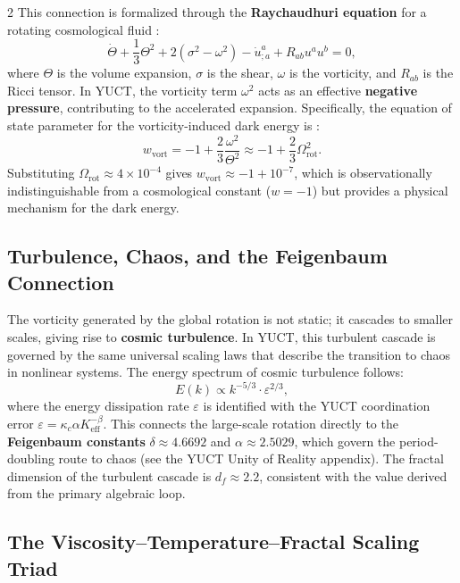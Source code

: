 \documentclass[12pt,a4paper]{article}
\begin{document}
\begin{multicols}{2}
		This connection is formalized through the \textbf{Raychaudhuri equation} for a rotating cosmological fluid \cite{Ellis1971}:
		\begin{equation}
			\dot{\Theta} + \frac{1}{3}\Theta^2 + 2(\sigma^2 - \omega^2) - \dot{u}^a_{;a} + R_{ab}u^a u^b = 0,
		\end{equation}
		where \(\Theta\) is the volume expansion, \(\sigma\) is the shear, \(\omega\) is the vorticity, and \(R_{ab}\) is the Ricci tensor. In YUCT, the vorticity term \(\omega^2\) acts as an effective \textbf{negative pressure}, contributing to the accelerated expansion. Specifically, the equation of state parameter for the vorticity-induced dark energy is \cite{Tsagas2011}:
		\begin{equation}
			w_{\mathrm{vort}} = -1 + \frac{2}{3}\frac{\omega^2}{\Theta^2} \approx -1 + \frac{2}{3}\Omega_{\mathrm{rot}}^2.
		\end{equation}
		Substituting \(\Omega_{\mathrm{rot}} \approx 4 \times 10^{-4}\) gives \(w_{\mathrm{vort}} \approx -1 + 10^{-7}\), which is observationally indistinguishable from a cosmological constant (\(w = -1\)) but provides a physical mechanism for the dark energy.
		
		\subsection{Turbulence, Chaos, and the Feigenbaum Connection}
		
		The vorticity generated by the global rotation is not static; it cascades to smaller scales, giving rise to \textbf{cosmic turbulence}. In YUCT, this turbulent cascade is governed by the same universal scaling laws that describe the transition to chaos in nonlinear systems. The energy spectrum of cosmic turbulence follows:
		\begin{equation}
			E(k) \propto k^{-5/3} \cdot \varepsilon^{2/3},
		\end{equation}
		where the energy dissipation rate \(\varepsilon\) is identified with the YUCT coordination error \(\varepsilon = \kappa_c \alpha K_{\mathrm{eff}}^{-\beta}\). This connects the large-scale rotation directly to the \textbf{Feigenbaum constants} \(\delta \approx 4.6692\) and \(\alpha \approx 2.5029\), which govern the period-doubling route to chaos (see the YUCT Unity of Reality appendix). The fractal dimension of the turbulent cascade is \(d_f \approx 2.2\), consistent with the value derived from the primary algebraic loop.
		
		\subsection{The Viscosity–Temperature–Fractal Scaling Triad}
		

\end{multicols}
\end{document}
